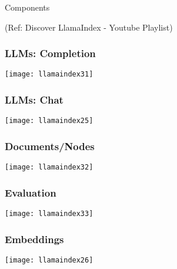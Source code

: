 \begin{frame}[fragile]\frametitle{}
\begin{center}
{\Large Components}

{\tiny (Ref: Discover LlamaIndex - Youtube Playlist)}

\end{center}
\end{frame}

\begin{frame}[fragile]\frametitle{LLMs: Completion}

\begin{center}
\texttt{[image: llamaindex31]}
\end{center}
\end{frame}

\begin{frame}[fragile]\frametitle{LLMs: Chat}

\begin{center}
\texttt{[image: llamaindex25]}
\end{center}
\end{frame}

\begin{frame}[fragile]\frametitle{Documents/Nodes}

\begin{center}
\texttt{[image: llamaindex32]}
\end{center}
\end{frame}

\begin{frame}[fragile]\frametitle{Evaluation}

\begin{center}
\texttt{[image: llamaindex33]}
\end{center}
\end{frame}


\begin{frame}[fragile]\frametitle{Embeddings}

\begin{center}
\texttt{[image: llamaindex26]}
\end{center}
\end{frame}

